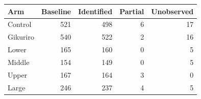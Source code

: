 \begin{tabular}{lrrrr}
\toprule
Arm & Baseline & Identified & Partial & Unobserved \\
\midrule
Control & 521 & 498 & 6 & 17 \\
Gikuriro & 540 & 522 & 2 & 16 \\
Lower & 165 & 160 & 0 & 5 \\
Middle & 154 & 149 & 0 & 5 \\
Upper & 167 & 164 & 3 & 0 \\
Large & 246 & 237 & 4 & 5 \\
\bottomrule
\end{tabular}
